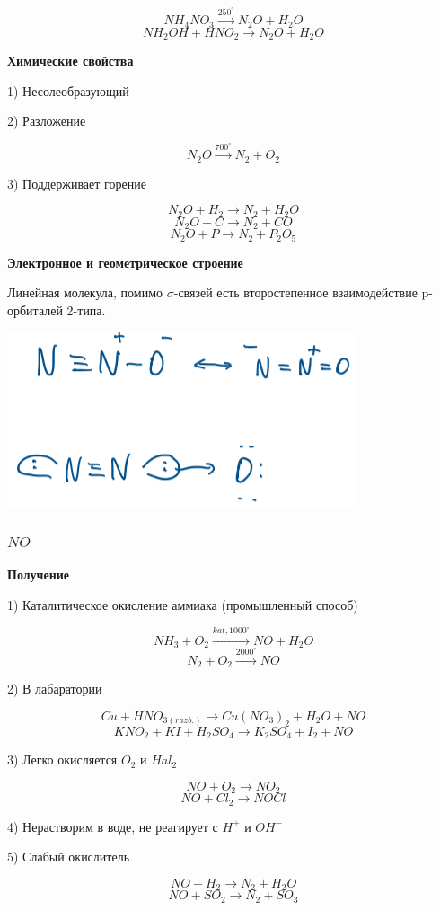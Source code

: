 \documentclass[14pt,a4paper]{scrartcl}
\begin{document}
$$NH_4NO_3 \xrightarrow{250^{\circ}} N_2O + H_2O$$
$$NH_2OH + HNO_2 \rightarrow N_2O + H_2O$$

\textbf{Химические свойства}

1) Несолеобразующий

2) Разложение

$$N_2O \xrightarrow{700^{\circ}} N_2 +O_2$$

3) Поддерживает горение

$$N_2O + H_2 \rightarrow N_2 + H_2O$$
$$N_2O + C \rightarrow N_2 + CO$$
$$N_2O + P \rightarrow N_2 + P_2O_5$$

\textbf{Электронное и геометрическое строение}

Линейная молекула, помимо $\sigma$-связей есть второстепенное взаимодействие p-орбиталей 2-типа.

\includegraphics{8v7.png}

\subsubsection{$NO$}

\textbf{Получение}

1) Каталитическое окисление аммиака (промышленный способ)

$$NH_3 + O_2 \xrightarrow{kat, 1000^{\circ}} NO + H_2O$$
$$N_2 + O_2 \xrightarrow{2000^{\circ}} NO$$

2) В лабаратории

$$ Cu + HNO_{3(razb.)}\rightarrow Cu(NO_3)_2 + H_2O + NO$$
$$KNO_2 + KI + H_2SO_4 \rightarrow K_2SO_4 + I_2 + NO$$

3) Легко окисляется $O_2$ и $Hal_2$

$$NO + O_2 \rightarrow NO_2$$
$$NO + Cl_2 \rightarrow NOCl$$

4) Нерастворим в воде, не реагирует с $H^+$ и $OH^-$

5) Слабый окислитель

$$NO + H_2 \rightarrow N_2 + H_2O$$
$$NO + SO_2 \rightarrow N_2 + SO_3$$
\end{document}
